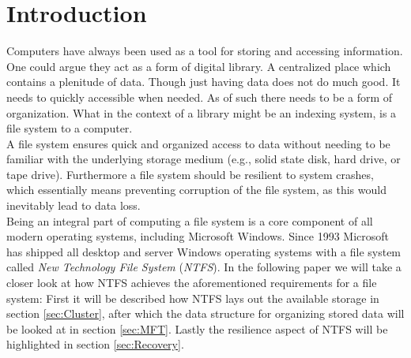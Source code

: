 \section{Introduction}
Computers have always been used as a tool for storing and accessing information. One could argue they act as a form of digital library. A centralized place which contains a plenitude of data.
Though just having data does not do much good. It needs to quickly accessible when needed. As of such there  needs to be a form of organization. What in the context of a library might be an indexing system, is a file system to a computer.\\
A file system ensures quick and organized access to data without needing to be familiar with the underlying storage medium (e.g., solid state disk, hard drive, or tape drive).
Furthermore a file system should be resilient to system crashes, which essentially means preventing corruption of the file system, as this would inevitably lead to data loss.\\
Being an integral part of computing a file system is a core component of all modern operating systems, including Microsoft Windows. Since 1993\cite{Custer:1994:IWN} Microsoft has shipped all desktop and server Windows operating systems with a file system called \textit{New Technology File System} (\textit{NTFS}). In the following paper we will take a closer look at how NTFS achieves the aforementioned requirements for a file system: First it will be described how NTFS lays out the available storage in section \ref{sec:Cluster}, after which the data structure for organizing stored data will be looked at in section \ref{sec:MFT}. Lastly the resilience aspect of NTFS will be highlighted in section \ref{sec:Recovery}.